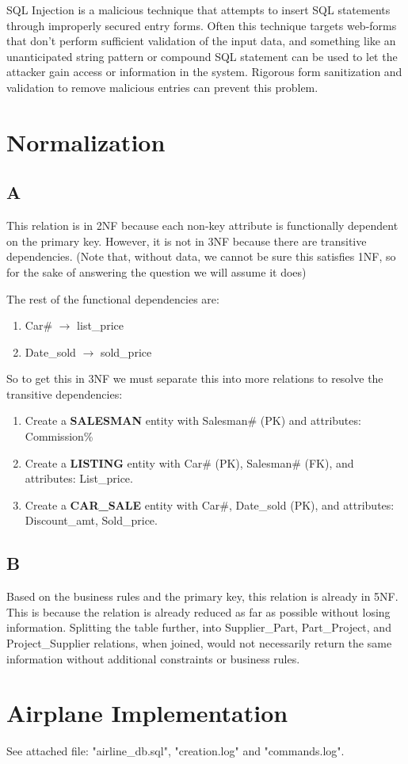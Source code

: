 \documentclass[a4paper,11pt]{article}
\begin{document}
SQL Injection is a malicious technique that attempts to insert SQL statements through improperly secured entry forms.  Often this technique targets web-forms that don't perform sufficient validation of the input data, and something like an unanticipated string pattern or compound SQL statement can be used to let the attacker gain access or information in the system.  Rigorous form sanitization and validation to remove malicious entries can prevent this problem.

\section{Normalization}
\subsection*{A}
This relation is in 2NF because each non-key attribute is functionally dependent on the primary key.  However, it is not in 3NF because there are transitive dependencies.  (Note that, without data, we cannot be sure this satisfies 1NF, so for the sake of answering the question we will assume it does)

The rest of the functional dependencies are:
\begin{enumerate}
  \item Car\# $\rightarrow$ list\_price
  \item Date\_sold $\rightarrow$ sold\_price
\end{enumerate}
 
 So to get this in 3NF we must separate this into more relations to resolve the transitive dependencies:
 
 \begin{enumerate}
  \item Create a {\bf SALESMAN} entity with Salesman\# (PK) and attributes: Commission\%
  \item Create a {\bf LISTING} entity with Car\# (PK), Salesman\# (FK), and attributes: List\_price. 
  \item Create a {\bf CAR\_SALE} entity with {Car\#, Date\_sold} (PK), and attributes: Discount\_amt, Sold\_price.
\end{enumerate}
 

\subsection*{B}
Based on the business rules and the primary key, this relation is already in 5NF.  This is because the relation is already reduced as far as possible without losing information.  Splitting the table further, into Supplier\_Part, Part\_Project, and Project\_Supplier relations, when joined, would not necessarily return the same information without additional constraints or business rules.

\section{Airplane Implementation}
See attached file: "airline\_db.sql", "creation.log" and "commands.log".
\end{document}
